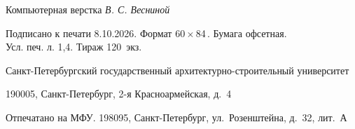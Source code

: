 \documentclass[a5paper,10pt,twoside,openany,article]{memoir} %
\begin{document}
\gappto\captionsrussian{} %




\mainmatter*                  %


\vspace*{0pt plus1fill}

\newcommand{\theTypesetter}{В. С. Весниной}
\newcommand{\thePrintDate}{8.10.2026}
\newcommand{\thePrintSheets}{1,4}
\newcommand{\thePrintRun}{120}
\newcommand{\thePrintOrder}{\fixme{24}}
\newcommand{\theUniversityFullName}{Санкт-Петербургский государственный архитектурно-строительный университет}
\newcommand{\theUniversityAddress}{190005, Санкт-Петербург, 2-я Красноармейская, д.~4}
\newcommand{\thePrintShopAddress}{198095, Санкт-Петербург, ул.~Розенштейна, д.~32, лит.~А}

{\fontsize{9}{11}\selectfont
 \setlength{\parskip}{0pt}%
 \setlength{\topsep}{0pt}%
 \setlength{\partopsep}{0pt}%
 \setlength{\parsep}{0pt}%
 \begin{center}
    Компьютерная верстка \textit{\theTypesetter}

    Подписано к печати \thePrintDate. Формат 60\,\(\times\)\,84\,. Бумага офсетная.\\
    Усл. печ. л. \thePrintSheets. Тираж \thePrintRun\ экз.

    \theUniversityFullName

    \theUniversityAddress

    Отпечатано на МФУ. \thePrintShopAddress
 \end{center}
}
\clearpage
\end{document}
